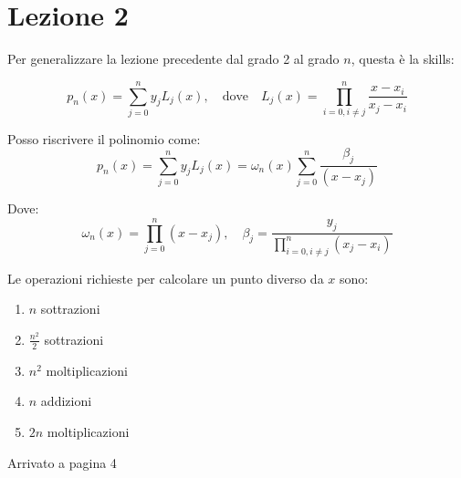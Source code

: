 \section{Lezione 2}

Per generalizzare la lezione precedente dal grado 2 al grado $n$, questa è la skills:


\begin{equation}
    p_n(x) = \sum_{j = 0}^{n}{y_j L_j(x)}, \quad \text{dove} \quad L_j(x) = \prod_{i = 0, i \neq j}^{n}{\frac{
        x - x_i
    }{
        x_j - x_i
    }}
\end{equation}


Posso riscrivere il polinomio come:
\begin{equation}
    p_n(x) = \sum_{j = 0}^{n}{y_j L_j(x)} = \omega_n(x) \sum_{j = 0}^{n}{\frac{
        \beta_j
    }{
        (x - x_j)
    }}
\end{equation}

Dove:
\begin{equation}
    \omega_n(x) = \prod_{j = 0}^{n}{(x - x_j)}, \quad \beta_j = \frac{
        y_j
    }{
        \prod_{i = 0, i \neq j}^{n}{(x_j - x_i)}
    }
\end{equation}


Le operazioni richieste per calcolare un punto diverso da $x$ sono:
\begin{enumerate}
    \item $n$ sottrazioni
    \item $\frac{n^2}{2}$ sottrazioni
    \item $n^2$ moltiplicazioni
    \item $n$ addizioni
    \item $2n$ moltiplicazioni
\end{enumerate}

Arrivato a pagina 4